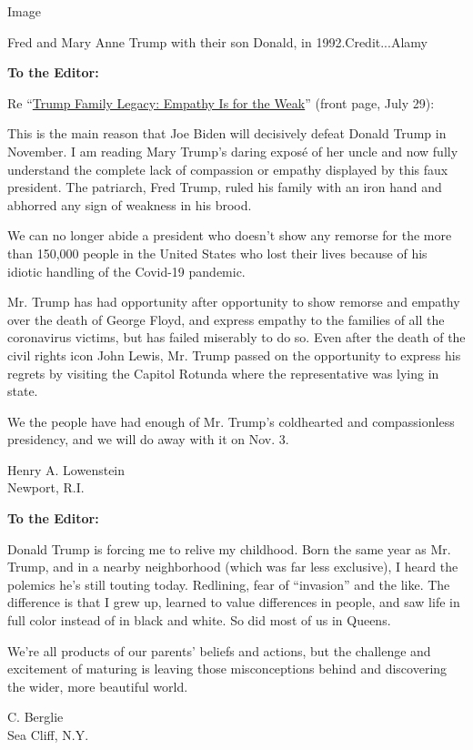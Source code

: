 Image

Fred and Mary Anne Trump with their son Donald, in 1992.Credit...Alamy

\textbf{To the Editor:}

Re
``\href{https://www.nytimes3xbfgragh.onion/2020/07/28/us/politics/donald-fred-trump.html}{Trump
Family Legacy: Empathy Is for the Weak}'' (front page, July 29):

This is the main reason that Joe Biden will decisively defeat Donald
Trump in November. I am reading Mary Trump's daring exposé of her uncle
and now fully understand the complete lack of compassion or empathy
displayed by this faux president. The patriarch, Fred Trump, ruled his
family with an iron hand and abhorred any sign of weakness in his brood.

We can no longer abide a president who doesn't show any remorse for the
more than 150,000 people in the United States who lost their lives
because of his idiotic handling of the Covid-19 pandemic.

Mr. Trump has had opportunity after opportunity to show remorse and
empathy over the death of George Floyd, and express empathy to the
families of all the coronavirus victims, but has failed miserably to do
so. Even after the death of the civil rights icon John Lewis, Mr. Trump
passed on the opportunity to express his regrets by visiting the Capitol
Rotunda where the representative was lying in state.

We the people have had enough of Mr. Trump's coldhearted and
compassionless presidency, and we will do away with it on Nov. 3.

Henry A. Lowenstein\\
Newport, R.I.

\textbf{To the Editor:}

Donald Trump is forcing me to relive my childhood. Born the same year as
Mr. Trump, and in a nearby neighborhood (which was far less exclusive),
I heard the polemics he's still touting today. Redlining, fear of
``invasion'' and the like. The difference is that I grew up, learned to
value differences in people, and saw life in full color instead of in
black and white. So did most of us in Queens.

We're all products of our parents' beliefs and actions, but the
challenge and excitement of maturing is leaving those misconceptions
behind and discovering the wider, more beautiful world.

C. Berglie\\
Sea Cliff, N.Y.

